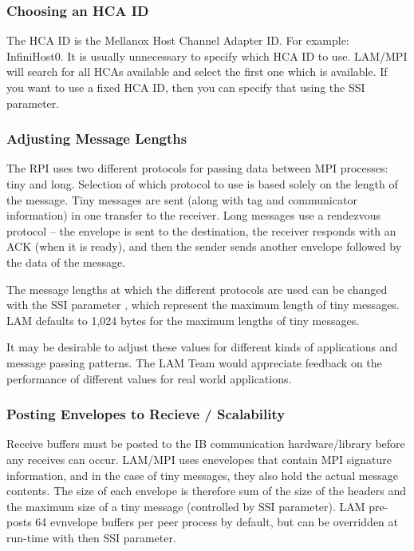 \subsubsection{Choosing an HCA ID}

The HCA ID is the Mellanox Host Channel Adapter ID.  For example:
InfiniHost0.  It is usually unnecessary to specify which HCA ID to
use.  LAM/MPI will search for all HCAs available and select the first
one which is available.  If you want to use a fixed HCA ID, then you
can specify that using the  SSI
parameter.


\subsubsection{Adjusting Message Lengths}

The  RPI uses two different protocols for passing data between
MPI processes: tiny and long.  Selection of which protocol to use is
based solely on the length of the message.  Tiny messages are sent
(along with tag and communicator information) in one transfer to the
receiver.  Long messages use a rendezvous protocol -- the envelope is
sent to the destination, the receiver responds with an ACK (when it is
ready), and then the sender sends another envelope followed by the
data of the message.

The message lengths at which the different protocols are used can be
changed with the SSI parameter  ,
which represent the maximum length of tiny messages.  LAM defaults to
1,024 bytes for the maximum lengths of tiny messages.

It may be desirable to adjust these values for different kinds of
applications and message passing patterns.  The LAM Team would
appreciate feedback on the performance of different values for real
world applications.


\subsubsection{Posting Envelopes to Recieve / Scalability}
\label{sec:mpi-ssi-ib-envelopes}

Receive buffers must be posted to the IB communication
hardware/library before any receives can occur.  LAM/MPI uses
enevelopes that contain MPI signature information, and in the case of
tiny messages, they also hold the actual message contents.
%
The size of each envelope is therefore sum of the size of the headers
and the maximum size of a tiny message (controlled by
 SSI parameter).  LAM pre-posts 64
evnvelope buffers per peer process by default, but can be overridden
at run-time with then  SSI
parameter.

